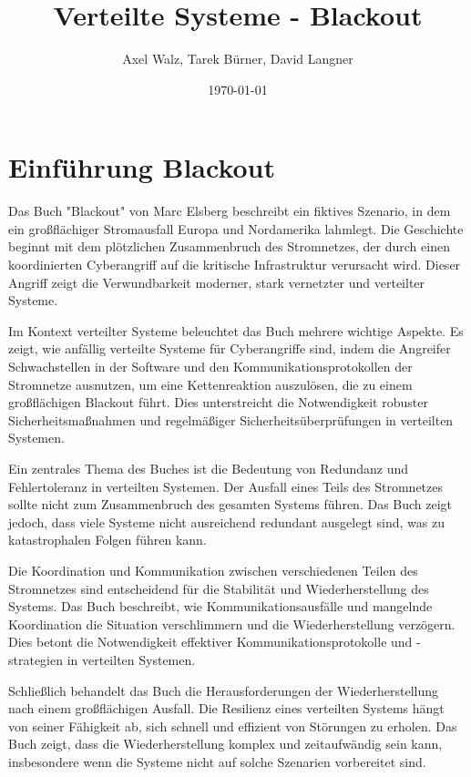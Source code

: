 \documentclass[a4paper,12pt]{article}
\title{Verteilte Systeme - Blackout}
\author{Axel Walz, Tarek Bürner, David Langner}
\date{\today}
\let\stdsection\section
\renewcommand\section{\newpage\stdsection}
\begin{document}
\onehalfspacing 

\maketitle

\newpage 
\tableofcontents
\newpage 
\pagestyle{plain}

\section{Einführung Blackout}
Das Buch "Blackout" von Marc Elsberg beschreibt ein fiktives Szenario, in dem ein großflächiger Stromausfall Europa und Nordamerika lahmlegt. Die Geschichte beginnt mit dem plötzlichen Zusammenbruch des Stromnetzes, der durch einen koordinierten Cyberangriff auf die kritische Infrastruktur verursacht wird. Dieser Angriff zeigt die Verwundbarkeit moderner, stark vernetzter und verteilter Systeme.

Im Kontext verteilter Systeme beleuchtet das Buch mehrere wichtige Aspekte. Es zeigt, wie anfällig verteilte Systeme für Cyberangriffe sind, indem die Angreifer Schwachstellen in der Software und den Kommunikationsprotokollen der Stromnetze ausnutzen, um eine Kettenreaktion auszulösen, die zu einem großflächigen Blackout führt. Dies unterstreicht die Notwendigkeit robuster Sicherheitsmaßnahmen und regelmäßiger Sicherheitsüberprüfungen in verteilten Systemen.

Ein zentrales Thema des Buches ist die Bedeutung von Redundanz und Fehlertoleranz in verteilten Systemen. Der Ausfall eines Teils des Stromnetzes sollte nicht zum Zusammenbruch des gesamten Systems führen. Das Buch zeigt jedoch, dass viele Systeme nicht ausreichend redundant ausgelegt sind, was zu katastrophalen Folgen führen kann.

Die Koordination und Kommunikation zwischen verschiedenen Teilen des Stromnetzes sind entscheidend für die Stabilität und Wiederherstellung des Systems. Das Buch beschreibt, wie Kommunikationsausfälle und mangelnde Koordination die Situation verschlimmern und die Wiederherstellung verzögern. Dies betont die Notwendigkeit effektiver Kommunikationsprotokolle und -strategien in verteilten Systemen.

Schließlich behandelt das Buch die Herausforderungen der Wiederherstellung nach einem großflächigen Ausfall. Die Resilienz eines verteilten Systems hängt von seiner Fähigkeit ab, sich schnell und effizient von Störungen zu erholen. Das Buch zeigt, dass die Wiederherstellung komplex und zeitaufwändig sein kann, insbesondere wenn die Systeme nicht auf solche Szenarien vorbereitet sind.
\end{document}
